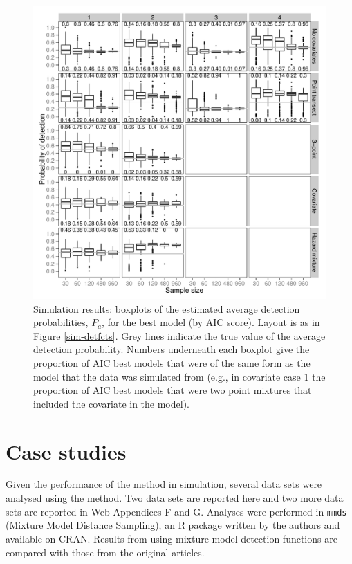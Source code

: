 \documentclass[useAMS,referee]{biom}
\begin{document}
\begin{figure}
\centering
\includegraphics[width=\textwidth]{simulations/pa-plot.pdf}
\caption{Simulation results: boxplots of the estimated average detection probabilities, $P_a$, for the best model (by AIC score). Layout is as in Figure \ref{sim-detfcts}. Grey lines indicate the true value of the average detection probability. Numbers underneath each boxplot give the proportion of AIC best models that were of the same form as the model that the data was simulated from (e.g., in covariate case 1 the proportion of AIC best models that were two point mixtures that included the covariate in the model).}
\label{sim-boxplots}
\end{figure}


\section{Case studies}
\label{s:data}

Given the performance of the method in simulation, several data sets were analysed using the method. Two data sets are reported here and two more data sets are reported in Web Appendices F and G. Analyses were performed in \texttt{mmds} (Mixture Model Distance Sampling), an \textsf{R} package written by the authors and available on CRAN. Results from using mixture model detection functions are compared with those from the original articles.
\end{document}
